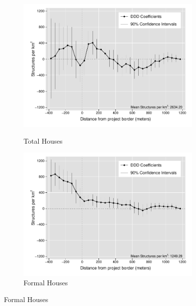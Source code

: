 \documentclass[12pt]{article}
\begin{document}
\begin{figure}[t!]
    \centering
    \vspace{2mm}
    \begin{subfigure}[b]{0.49\textwidth}
        \centering
        \caption[]{\small Total Houses}  
        \vspace{-1mm}
        \includegraphics[width=\textwidth,trim={.5cm .3cm .3cm 0cm}, clip=true]{figures/distplotDDD_bblu_total_buildings_admin_3}
        \label{fig:DDDtotal}
    \end{subfigure}
    \hfill
    \begin{subfigure}[b]{0.49\textwidth}  
        \centering 
        \caption[]{\small Formal Houses}
        \vspace{-1mm}
        \includegraphics[width=\textwidth,trim={.5cm .3cm .3cm 0cm}, clip=true]{figures/distplotDDD_bblu_for_admin_3}     

\end{subfigure}
\end{figure}
\end{document}
